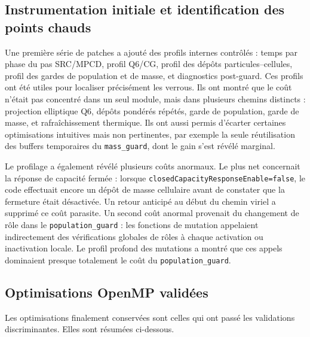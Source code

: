 \documentclass[11pt,a4paper]{article}
\begin{document}
\subsection{Instrumentation initiale et identification des points chauds}

Une première série de patches a ajouté des profils internes contrôlés : temps par phase du pas SRC/MPCD, profil Q6/CG, profil des dépôts particules--cellules, profil des gardes de population et de masse, et diagnostics post-guard. Ces profils ont été utiles pour localiser précisément les verrous. Ils ont montré que le coût n'était pas concentré dans un seul module, mais dans plusieurs chemins distincts : projection elliptique Q6, dépôts pondérés répétés, garde de population, garde de masse, et rafraîchissement thermique. Ils ont aussi permis d'écarter certaines optimisations intuitives mais non pertinentes, par exemple la seule réutilisation des buffers temporaires du \texttt{mass\_guard}, dont le gain s'est révélé marginal.

Le profilage a également révélé plusieurs coûts anormaux. Le plus net concernait la réponse de capacité fermée : lorsque \texttt{closedCapacityResponseEnable=false}, le code effectuait encore un dépôt de masse cellulaire avant de constater que la fermeture était désactivée. Un retour anticipé au début du chemin viriel a supprimé ce coût parasite. Un second coût anormal provenait du changement de rôle dans le \texttt{population\_guard} : les fonctions de mutation appelaient indirectement des vérifications globales de rôles à chaque activation ou inactivation locale. Le profil profond des mutations a montré que ces appels dominaient presque totalement le coût du \texttt{population\_guard}.

\subsection{Optimisations OpenMP validées}

Les optimisations finalement conservées sont celles qui ont passé les validations discriminantes. Elles sont résumées ci-dessous.
\end{document}
